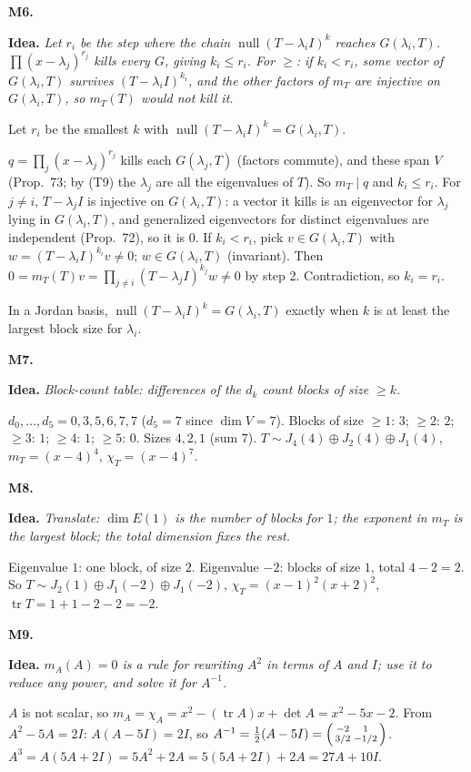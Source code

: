 \documentclass[10pt]{scrartcl}
\DeclareMathOperator{\nul}{null}
\DeclareMathOperator{\tr}{tr}
\newcommand{\idea}[1]{{\color{OliveGreen!75!black}\textbf{Idea.}} \textit{#1}\par}
\newenvironment{prob}{\par\medskip\noindent\begin{minipage}{\linewidth}\setlength{\parskip}{3pt}}{\end{minipage}\par}
\begin{document}
\begin{prob}
\textbf{M6. }\par 
\idea{Let $r_i$ be the step where the chain $\nul(T-\lambda_iI)^k$ reaches $G(\lambda_i,T)$. $\prod(x-\lambda_j)^{r_j}$ kills every $G$, giving $k_i\le r_i$. For $\ge$: if $k_i<r_i$, some vector of $G(\lambda_i,T)$ survives $(T-\lambda_iI)^{k_i}$, and the other factors of $m_T$ are injective on $G(\lambda_i,T)$, so $m_T(T)$ would not kill it.}
Let $r_i$ be the smallest $k$ with $\nul(T-\lambda_iI)^k=G(\lambda_i,T)$.
\begin{enumerate}[1.]
  \ii $q=\prod_j(x-\lambda_j)^{r_j}$ kills each $G(\lambda_j,T)$ (factors commute), and these span $V$ (Prop.~73; by (T9) the $\lambda_j$ are all the eigenvalues of $T$). So $m_T\mid q$ and $k_i\le r_i$.
  \ii For $j\ne i$, $T-\lambda_jI$ is injective on $G(\lambda_i,T)$: a vector it kills is an eigenvector for $\lambda_j$ lying in $G(\lambda_i,T)$, and generalized eigenvectors for distinct eigenvalues are independent (Prop.~72), so it is $0$.
  \ii If $k_i<r_i$, pick $v\in G(\lambda_i,T)$ with $w=(T-\lambda_iI)^{k_i}v\ne0$; $w\in G(\lambda_i,T)$ (invariant). Then $0=m_T(T)v=\prod_{j\ne i}(T-\lambda_jI)^{k_j}w\ne0$ by step 2. Contradiction, so $k_i=r_i$.
\end{enumerate}
In a Jordan basis, $\nul(T-\lambda_iI)^k=G(\lambda_i,T)$ exactly when $k$ is at least the largest block size for $\lambda_i$.
\end{prob}

\begin{prob}
\textbf{M7. }\par 
\idea{Block-count table: differences of the $d_k$ count blocks of size $\ge k$.}
$d_0,\dots,d_5=0,3,5,6,7,7$ ($d_5=7$ since $\dim V=7$). Blocks of size $\ge1$: $3$; $\ge2$: $2$; $\ge3$: $1$; $\ge4$: $1$; $\ge5$: $0$. Sizes $4,2,1$ (sum $7$). $T\sim J_4(4)\oplus J_2(4)\oplus J_1(4)$, $m_T=(x-4)^4$, $\chi_T=(x-4)^7$.
\end{prob}

\begin{prob}
\textbf{M8. }\par 
\idea{Translate: $\dim E(1)$ is the number of blocks for $1$; the exponent in $m_T$ is the largest block; the total dimension fixes the rest.}
Eigenvalue $1$: one block, of size $2$. Eigenvalue $-2$: blocks of size $1$, total $4-2=2$. So $T\sim J_2(1)\oplus J_1(-2)\oplus J_1(-2)$, $\chi_T=(x-1)^2(x+2)^2$, $\tr T=1+1-2-2=-2$.
\end{prob}

\begin{prob}
\textbf{M9. }\par 
\idea{$m_A(A)=0$ is a rule for rewriting $A^2$ in terms of $A$ and $I$; use it to reduce any power, and solve it for $A^{-1}$.}
$A$ is not scalar, so $m_A=\chi_A=x^2-(\tr A)x+\det A=x^2-5x-2$. From $A^2-5A=2I$: $A(A-5I)=2I$, so $A^{-1}=\frac12(A-5I)=\begin{psmallmatrix}-2&1\\3/2&-1/2\end{psmallmatrix}$. $A^3=A(5A+2I)=5A^2+2A=5(5A+2I)+2A=27A+10I$.
\end{prob}
\end{document}
